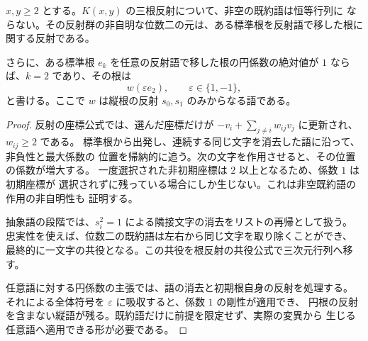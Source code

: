 \begin{lemma}[反射語の忠実性と単位円係数の剛性]
\label{bp:family-word-rigidity}
\leanok
\(x,y\ge2\) とする。\(K(x,y)\) の三根反射について、非空の既約語は恒等行列に
ならない。その反射群の非自明な位数二の元は、ある標準根を反射語で移した根に
関する反射である。

さらに、ある標準根 \(e_k\) を任意の反射語で移した根の円係数の絶対値が \(1\)
ならば、\(k=2\) であり、その根は
\[
 w(\varepsilon e_2),\qquad \varepsilon\in\{1,-1\},
\]
と書ける。ここで \(w\) は縦根の反射 \(s_0,s_1\) のみからなる語である。
\end{lemma}
\begin{proof}
\leanok
反射の座標公式では、選んだ座標だけが
\(-v_i+\sum_{j\ne i}w_{ij}v_j\) に更新され、\(w_{ij}\ge2\) である。
標準根から出発し、連続する同じ文字を消去した語に沿って、非負性と最大係数の
位置を帰納的に追う。次の文字を作用させると、その位置の係数が増大する。
一度選択された非初期座標は \(2\) 以上となるため、係数 \(1\) は初期座標が
選択されずに残っている場合にしか生じない。これは非空既約語の作用の非自明性も
証明する。

抽象語の段階では、\(s_i^2=1\) による隣接文字の消去をリストの再帰として扱う。
忠実性を使えば、位数二の既約語は左右から同じ文字を取り除くことができ、
最終的に一文字の共役となる。この共役を根反射の共役公式で三次元行列へ移す。

任意語に対する円係数の主張では、語の消去と初期根自身の反射を処理する。
それによる全体符号を \(\varepsilon\) に吸収すると、係数 \(1\) の剛性が適用でき、
円根の反射を含まない縦語が残る。既約語だけに前提を限定せず、実際の変異から
生じる任意語へ適用できる形が必要である。
\end{proof}

